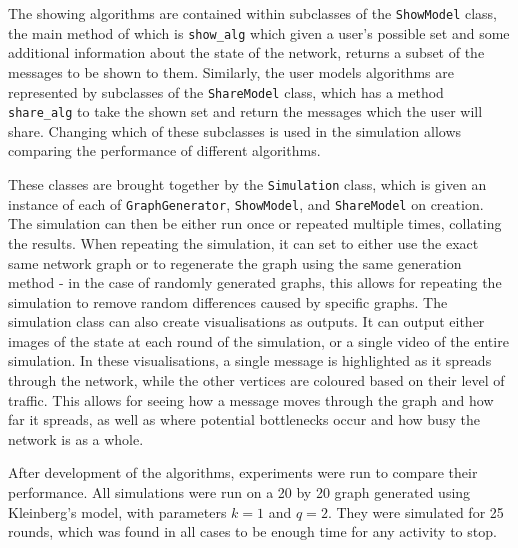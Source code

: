 \documentclass[bsc,frontabs,twoside,singlespacing,parskip,deptreport]{infthesis}     %
\begin{document}
The showing algorithms are contained within subclasses of the \texttt{ShowModel} class, the main method of which is \texttt{show\_alg} which given a user's possible set and some additional information about the state of the network, returns a subset of the messages to be shown to them. Similarly, the user models algorithms are represented by subclasses of the \texttt{ShareModel} class, which has a method \texttt{share\_alg} to take the shown set and return the messages which the user will share. Changing which of these subclasses is used in the simulation allows comparing the performance of different algorithms.

These classes are brought together by the \texttt{Simulation} class, which is given an instance of each of \texttt{GraphGenerator}, \texttt{ShowModel}, and \texttt{ShareModel} on creation. The simulation can then be either run once or repeated multiple times, collating the results. When repeating the simulation, it can set to either use the exact same network graph or to regenerate the graph using the same generation method - in the case of randomly generated graphs, this allows for repeating the simulation to remove random differences caused by specific graphs. The simulation class can also create visualisations as outputs. It can output either images of the state at each round of the simulation, or a single video of the entire simulation. In these visualisations, a single message is highlighted as it spreads through the network, while the other vertices are coloured based on their level of traffic. This allows for seeing how a message moves through the graph and how far it spreads, as well as where potential bottlenecks occur and how busy the network is as a whole.

After development of the algorithms, experiments were run to compare their performance. All simulations were run on a 20 by 20 graph generated using Kleinberg's model, with parameters $k = 1$ and $q = 2$. They were simulated for 25 rounds, which was found in all cases to be enough time for any activity to stop. 
\end{document}
